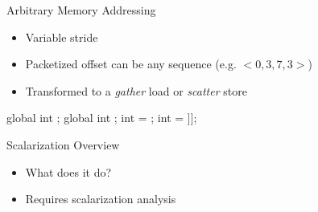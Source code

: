 \begin{frame}[fragile]{Arbitrary Memory Addressing}

\begin{itemize}
    \item Variable stride
    \item Packetized offset can be any sequence (e.g. $<0, 3, 7, 3>$)
    \item Transformed to a \emph{gather} load or \emph{scatter} store
\end{itemize}

\begin{codebox}[commandchars=\\\[\]]
global int \uniform[*src]; global int \uniform[*map];
int \varying[tid] = ;
int \uniform[x] = \uniform[src]\idx[\uniform[map]\idx[\varying[tid]]];
\end{codebox}



\end{frame}



\begin{frame}{Scalarization Overview}

\begin{itemize}
    \item What does it do?
    \item Requires scalarization analysis
\end{itemize}

\end{frame}

